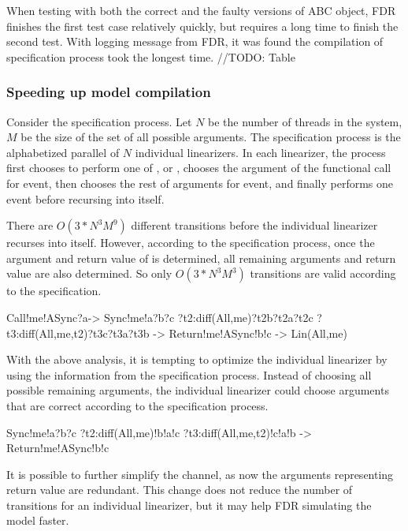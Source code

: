 \documentclass{article}
\begin{document}
When testing with both the correct and the faulty versions of ABC object, FDR finishes the first test case relatively quickly, but requires a long time to finish the second test. With logging message from FDR, it was found the compilation of specification process took the longest time. 
//TODO: Table

\subsubsection{Speeding up model compilation}
Consider the specification process. Let $N$ be the number of threads in the system, $M$ be the size of the set of all possible arguments. The specification process is the alphabetized parallel of $N$ individual linearizers. In each linearizer, the process first chooses to perform one of ,  or , chooses the argument of the functional call for  event, then chooses the rest of arguments for  event, and finally performs one event before recursing into itself.

There are $O(3*N^3M^9)$ different transitions before the individual linearizer recurses into itself. However, according to the specification process, once the argument and return value of  is determined, all remaining arguments and return value are also determined. So only $O(3*N^3M^3)$ transitions are valid according to the specification. 

\begin{cspinline}{}{}
  Call!me!ASync?a->
    Sync!me!a?b?c 
        ?t2:diff(All,{me})?t2b?t2a?t2c 
        ?t3:diff(All,{me,t2})?t3c?t3a?t3b ->
    Return!me!ASync!b!c ->
    Lin(All,me)
\end{cspinline}
    
With the above analysis, it is tempting to optimize the individual linearizer by using the information from the specification process. Instead of choosing all possible remaining arguments, the individual linearizer could choose arguments that are correct according to the specification process.

\begin{cspinline}{}{}
  Sync!me!a?b?c 
      ?t2:diff(All,{me})!b!a!c
      ?t3:diff(All,{me,t2})!c!a!b ->
  Return!me!ASync!b!c
\end{cspinline}

It is possible to further simplify the  channel, as now the arguments representing return value are redundant. This change does not reduce the number of transitions for an individual linearizer, but it may help FDR simulating the model faster.
\end{document}
